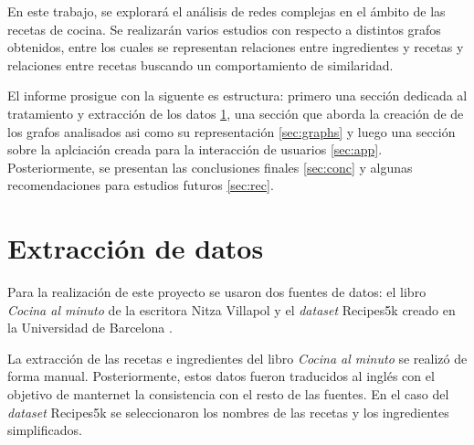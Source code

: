 \documentclass[a4paper]{article}
\begin{document}
En este trabajo, se explorará el análisis de redes complejas en el ámbito de las
recetas de cocina. Se realizarán varios estudios con respecto a distintos grafos
obtenidos, entre los cuales se representan relaciones entre ingredientes y
recetas y relaciones entre recetas buscando un comportamiento de similaridad.

El informe prosigue con la siguente es estructura: primero una sección dedicada
al tratamiento y extracción de los datos \ref{sec:data}, una sección que
aborda la creación de de los grafos analisados asi como su representación
\ref{sec:graphs} y luego una sección sobre la aplciación creada para la
interacción de usuarios \ref{sec:app}. Posteriormente, se presentan las
conclusiones finales \ref{sec:conc} y algunas recomendaciones para estudios
futuros \ref{sec:rec}.







\section{Extracción de datos}\label{sec:data}

Para la realización de este proyecto se usaron dos fuentes de datos: el libro
\emph{Cocina al minuto} de la escritora Nitza Villapol y el \emph{dataset}
Recipes5k creado en la Universidad de Barcelona \cite{bolanos2017food}.

La extracción de las recetas e ingredientes del libro \emph{Cocina al minuto}
se realizó de forma manual. Posteriormente, estos datos fueron traducidos al
inglés con el objetivo de manternet la consistencia con el resto de las
fuentes. En el caso del \emph{dataset} Recipes5k se seleccionaron los nombres
de las recetas y los ingredientes simplificados.
\end{document}
